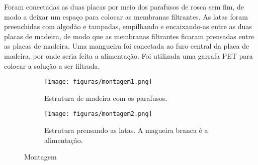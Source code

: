 Foram conectadas as duas placas por meio dos parafusos de rosca sem fim, de modo
a deixar um espaço para colocar as membranas filtrantes. As latas foram
preenchidas com algodão e tampadas, empilhando e encaixando-as entre as duas
placas de madeira, de modo que as membranas filtrantes ficaram prensadas entre
as placas de madeira. Uma mangueira foi conectada ao furo central da placa de
madeira, por onde seria feita a alimentação. Foi utilizada uma garrafa PET para
colocar a solução a ser filtrada.

\begin{figure}
  \begin{subfigure}[H]{0.4\textwidth}
    \texttt{[image: figuras/montagem1.png]}
    \caption{Estrutura de madeira com os parafusos.}
  \end{subfigure}%
  \hfill
  \begin{subfigure}[H]{0.4\textwidth}
    \texttt{[image: figuras/montagem2.png]}
    \caption{Estrutura prensando as latas. A magueira branca é a alimentação.}
  \end{subfigure}%
  \caption{Montagem}
\end{figure}


